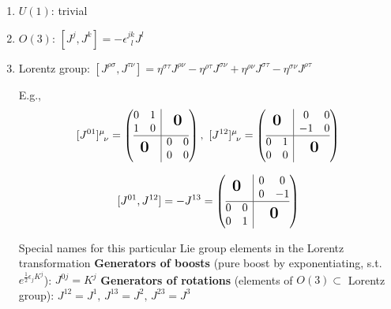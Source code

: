 \begin{enumerate}
\item $U(1)$: trivial
\item $O(3)$: $[J^j, J^k] = -\epsilon^{jk}_{\,\,\, l} J^l$ 
\item Lorentz group: $[J^{\rho\sigma}, J^{\tau\nu}] = \eta^{\sigma\tau}J^{\rho\nu} - \eta^{\rho\tau}J^{\sigma\nu} + \eta^{\rho\nu}J^{\sigma\tau} - \eta^{\sigma\nu}J^{\rho\tau}$

\subitem E.g., \[ [J^{01}]^\mu_{\,\,\, \nu} = 
\left( 
\begin{array}{@{}c|c@{}}
\begin{matrix} 0 & 1 \\ 1 & 0 \end{matrix} & \bigzero \\
\hline
\bigzero & \begin{matrix} 0 & 0 \\ 0 & 0 \end{matrix} 
\end{array} \right), \,\, [J^{12}]^\mu_{\,\,\, \nu} = 
\left( 
\begin{array}{@{}c|c@{}}
\bigzero & \begin{matrix} 0 & 0 \\ -1 & 0 \end{matrix} \\
\hline
\begin{matrix} 0 & 1 \\ 0 & 0 \end{matrix} & \bigzero
\end{array} \right) \]

\subitem \[ [J^{01}, J^{12}] = -J^{13} =  
\left( 
\begin{array}{@{}c|c@{}}
\bigzero & \begin{matrix} 0 & 0 \\ 0 & -1 \end{matrix} \\
\hline
\begin{matrix} 0 & 0 \\ 0 & 1 \end{matrix} & \bigzero
\end{array} \right) \]

\subitem Special names for this particular Lie group elements in the Lorentz transformation
\subsubitem \textbf{Generators of boosts} (pure boost by exponentiating, s.t. $e^{\frac{1}{2} \epsilon_j K^j}$): 
\subsubitem $J^{0j} = K^j$
\subsubitem \textbf{Generators of rotations} (elements of $O(3) \subset$ Lorentz group): 
\subsubitem $J^{12} = J^1, \, J^{13} = J^2, \, J^{23} = J^3$
\end{enumerate}

